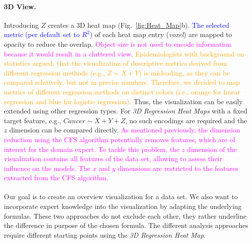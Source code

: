 \documentclass[journal]{style/vgtc} 			          %
\newcommand{\add}[1]{\textcolor{blue}{#1}}
\newcommand{\design}[1]{\textcolor{orange}{#1}}
\newcommand{\magenta}[1]{\textcolor{magenta}{#1}}
\begin{document}
\paragraph{3D View.}
Introducing $Z$ creates a 3D heat map (Fig.~\ref{fig:Heat_Map}b).
\add{The selected metric (per default set to $R^2$)} of each heat map entry (\emph{voxel}) are mapped to opacity to reduce the overlap.
\magenta{Object size is not used to encode information because it would result in a cluttered view.}
\design{
Epidemiologists with background on statistics argued, that the visualization of descriptive metrics derived from different regression methods (e.g., $Z \sim X + Y$) is misleading, as they can be compared relatively, but not in precise numbers.
Therefore, we decided to map metrics of different regression methods on distinct colors (i.e., orange for linear regression and blue for logistic regression).
}
Thus, the visualization can be easily extended using other regression types.
For \emph{3D Regression Heat Maps} with a fixed target feature, e.g., $Cancer \sim X + Y + Z$, no such encodings are required and the $z$ dimension can be compared directly.
\magenta{
As mentioned previously, the dimension reduction using the CFS algorithm potentially removes features, which are of interest for the domain expert.
To tackle this problem, the $z$ dimension of the visualization contains all features of the data set, allowing to assess their influence on the models.
The $x$ and $y$ dimensions are restricted to the features extracted from the CFS algorithm.
}
\\\\
Our goal is to create an overview visualization for a data set.
We also want to incorporate expert knowledge into the visualization by adapting the underlying formulas.
These two approaches do not exclude each other, they rather underline the difference in purpose of the chosen formula.
The different analysis approaches require different starting points using the \emph{3D Regression Heat Map}.
\end{document}
